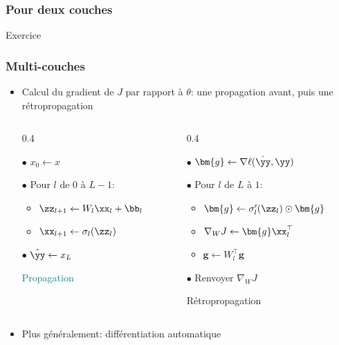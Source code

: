 \documentclass[9pt,table]{beamer} %
\begin{document}
\begin{frame}
\frametitle{Pour deux couches}


Exercice
\end{frame}



\begin{frame}
\frametitle{Multi-couches}


\begin{itemize}[label=\tiny$\blacksquare$]
	\item Calcul du gradient de $J$ par rapport à $\theta$: une propagation avant, puis une rétropropagation

	\begin{columns}[t]
	\begin{column}{0.4\textwidth}
	\centering
	\begin{tcolorbox}[colback=teal!20,width=0.8\textwidth]
	$\bullet$ $x_0 \leftarrow  x$
	
	$\bullet$ Pour $l$ de $0$ à $L-1$:
	\begin{itemize}[label=-]
		\item $\zz_{l+1} \leftarrow W_{l}\xx_{l} + \bb_{l}$
		\item $\xx_{l+1} \leftarrow \sigma_{l}(\zz_l)$
	\end{itemize}
	$\bullet$ $\hat{\yy} \leftarrow x_{L}$
	\end{tcolorbox}
	\textcolor{teal}{Propagation}
	
	\end{column}
	\begin{column}{0.4\textwidth}
	\centering
	\begin{tcolorbox}[colback=mLightBrown!20,width=0.9\textwidth]
	$\bullet$ $\bm{g} \leftarrow  \nabla \ell(\hat{\yy},\yy)$
	
	$\bullet$ Pour $l$ de $L$ à $1$:
	\begin{itemize}[label=-]
		\item $\bm{g} \leftarrow \sigma_l'(\zz_{l}) \odot \bm{g}$
		\item ${\nabla_{W} J} \leftarrow \bm{g}\xx_l^\top$
		\item $\bm{g} \leftarrow W_l^\top \bm{g}$
	\end{itemize}
	$\bullet$ Renvoyer ${\nabla_W J}$
	\end{tcolorbox}
	\textcolor{mLightBrown}{Rétropropagation}
	\end{column}
	\end{columns}
	
	
	\item Plus généralement: \alert{différentiation automatique}
\end{itemize}


\end{frame}
\end{document}

